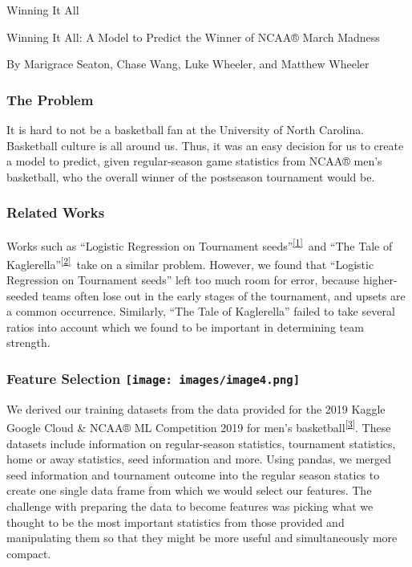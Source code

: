\documentclass[
]{article}
\author{}
\date{}
\begin{document}
{Winning It All }

{Winning It All: A Model to Predict the Winner of NCAA® March Madness }

{By Marigrace Seaton, Chase Wang, Luke Wheeler, and Matthew Wheeler}

{}

\hypertarget{h.qstvyj6ok5wp}{%
\subsubsection{\texorpdfstring{{The Problem
}}{The Problem }}\label{h.qstvyj6ok5wp}}

{It is hard to not be a basketball fan at the University of North
Carolina. Basketball culture is all around us. Thus, it was an easy
decision for us to create a model to predict, given regular-season game
statistics from NCAA® men's basketball, who the overall winner of the
postseason tournament would be. }

\hypertarget{h.580466xqskox}{%
\subsubsection{\texorpdfstring{{Related
Works}}{Related Works}}\label{h.580466xqskox}}

{Works such as ``Logistic Regression on Tournament
seeds''}\textsuperscript{\protect\hyperlink{ftnt1}{{[}1{]}}}{~and ``The
Tale of
Kaglerella''}\textsuperscript{\protect\hyperlink{ftnt2}{{[}2{]}}}{~take
on a similar problem. However, we found that ``Logistic Regression on
Tournament seeds'' left too much room for error, because higher-seeded
teams often lose out in the early stages of the tournament, and upsets
are a common occurrence. Similarly, ``The Tale of Kaglerella'' failed to
take several ratios into account which we found to be important in
determining team strength. }

\hypertarget{h.tsxh7upt40eq}{%
\subsubsection[{Feature Selection }]{\texorpdfstring{{Feature Selection
}{\protect\texttt{[image: images/image4.png]}}}{Feature Selection }}\label{h.tsxh7upt40eq}}

{We derived our training datasets from the data provided for the 2019
Kaggle Google Cloud \& NCAA® ML Competition 2019 for men's
basketball}\textsuperscript{\protect\hyperlink{ftnt3}{{[}3{]}}}{. These
datasets include information on regular-season statistics, tournament
statistics, home or away statistics, seed information and more. Using
pandas, we merged seed information and tournament outcome into the
regular season statics to create one single data frame from which we
would select our features. The challenge with preparing the data to
become features was picking what we thought to be the most important
statistics from those provided and manipulating them so that they might
be more useful and simultaneously more compact. }
\end{document}
